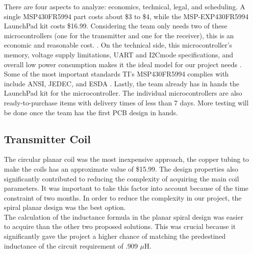 \documentclass[12pt]{article}
\begin{document}
\indent \indent
There are four aspects to analyze: economics, technical, legal, and scheduling. A single MSP430FR5994 part costs about \$3 to \$4, while the MSP-EXP430FR5994 LaunchPad kit costs \$16.99. Considering the team only needs two of these microcontrollers (one for the transmitter and one for the receiver), this is an economic and reasonable cost. \cite{MSP430FR599x}  \cite{testKit}. On the technical side, this microcontroller’s memory, voltage supply limitations, UART and I2Cmode specifications, and overall low power consumption makes it the ideal model for our project needs \cite{MSP430FR599x}. Some of the most important standards TI’s MSP430FR5994 complies with include ANSI, JEDEC, and ESDA \cite{MSP430FR599x}. Lastly, the team already has in hands the LaunchPad kit for the microcontroller. The individual microcontrollers are also ready-to-purchase items with delivery times of less than 7 days. More testing will be done once the team has the first PCB design in hands. 

\subsection{Transmitter Coil}


\indent \indent
The circular planar coil was the most inexpensive approach, the copper tubing to make the coils has an approximate value of  \$15.99. The design properties also significantly contributed to reducing the complexity of acquiring the main coil parameters. It was important to take this factor into account because of the time constraint of two months. In order to reduce the complexity in our project, the spiral planar design was the best option.\\

\indent
The calculation of the inductance formula in the planar spiral design was easier to acquire than the other two proposed solutions. This was crucial because it significantly gave the project a higher chance of matching the predestined inductance of the circuit requirement of .909 $\mu$H.\\
\end{document}
